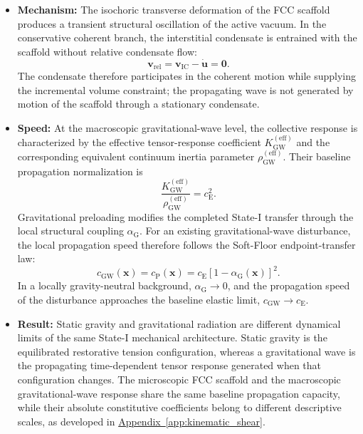 \begin{itemize}
    \item \textbf{Mechanism:} The isochoric transverse deformation of the FCC scaffold produces a transient structural oscillation of the active vacuum. In the conservative coherent branch, the interstitial condensate is entrained with the scaffold without relative condensate flow:
    \begin{equation}
        \mathbf{v}_{\mathrm{rel}} = \mathbf{v}_{\mathrm{IC}} - \dot{\mathbf{u}} = \mathbf{0}.
    \end{equation}
    The condensate therefore participates in the coherent motion while supplying the incremental volume constraint; the propagating wave is not generated by motion of the scaffold through a stationary condensate.

    \item \textbf{Speed:} At the macroscopic gravitational-wave level, the collective response is characterized by the effective tensor-response coefficient $K_{\mathrm{GW}}^{(\mathrm{eff})}$ and the corresponding equivalent continuum inertia parameter $\rho_{\mathrm{GW}}^{(\mathrm{eff})}$. Their baseline propagation normalization is
    \begin{equation}
        \frac{K_{\mathrm{GW}}^{(\mathrm{eff})}}{\rho_{\mathrm{GW}}^{(\mathrm{eff})}} = c_{\mathrm{E}}^2.
    \end{equation}
    Gravitational preloading modifies the completed State-I transfer through the local structural coupling $\alpha_{\mathrm{G}}$. For an existing gravitational-wave disturbance, the local propagation speed therefore follows the Soft-Floor endpoint-transfer law:
    \begin{equation}
        c_{\mathrm{GW}}(\mathbf{x}) = c_{\mathrm{P}}(\mathbf{x}) = c_{\mathrm{E}} \left[ 1-\alpha_{\mathrm{G}}(\mathbf{x}) \right]^2.
    \end{equation}
    In a locally gravity-neutral background, $\alpha_{\mathrm{G}}\rightarrow 0$, and the propagation speed of the disturbance approaches the baseline elastic limit, $c_{\mathrm{GW}}\rightarrow c_{\mathrm{E}}$.

    \item \textbf{Result:} Static gravity and gravitational radiation are different dynamical limits of the same State-I mechanical architecture. Static gravity is the equilibrated restorative tension configuration, whereas a gravitational wave is the propagating time-dependent tensor response generated when that configuration changes. The microscopic FCC scaffold and the macroscopic gravitational-wave response share the same baseline propagation capacity, while their absolute constitutive coefficients belong to different descriptive scales, as developed in \hyperref[app:kinematic_shear]{Appendix~\ref*{app:kinematic_shear}}.


\end{itemize}
